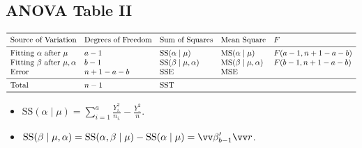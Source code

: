 \subsection*{ANOVA Table II}
\[ \begin{array}{lllll}
        \toprule
        \text{Source of Variation}                    & \text{Degrees of Freedom} & \text{Sum of Squares}           & \text{Mean Square}              & F              \\
        \midrule
        \text{Fitting }\alpha\text{ after }\mu        & a-1                       & \text{SS}(\alpha\mid \mu)       & \text{MS}(\alpha\mid \mu)       & F(a-1,n+1-a-b) \\
        \text{Fitting }\beta \text{ after }\mu,\alpha & b-1                       & \text{SS}(\beta\mid \mu,\alpha) & \text{MS}(\beta\mid \mu,\alpha) & F(b-1,n+1-a-b) \\
        \text{Error}                                  & n+1-a-b                   & \SSE                            & \MSE                                             \\
        \midrule
        \text{Total}                                  & n-1                       & \SST                                                                               \\
        \bottomrule
    \end{array} \]
\begin{itemize}
    \item $ \displaystyle \text{SS}(\alpha\mid \mu)=\sum_{i=1}^{a}\frac{Y_{i.}^2}{n_{i.}}-\frac{Y_{..}^2}{n}$.
    \item $ \displaystyle \text{SS}(\beta\mid \mu,\alpha)=\text{SS}(\alpha,\beta\mid \mu)-\text{SS}(\alpha\mid \mu)=\Vector{\beta}_{b-1}'\Vector{r} $.
\end{itemize}
